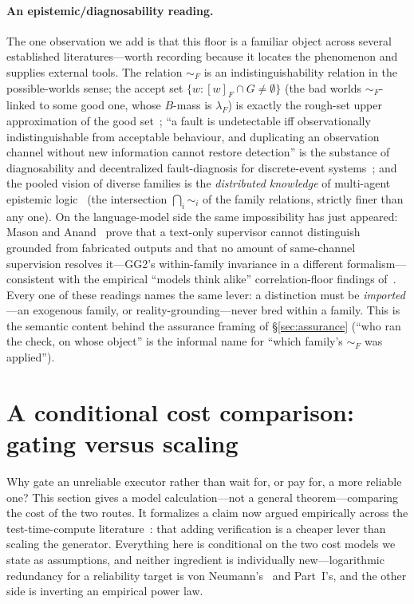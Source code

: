 \documentclass[11pt]{article}
\theoremstyle{definition}
\theoremstyle{remark}
\begin{document}
\paragraph{An epistemic/diagnosability reading.} The one observation we add is that this floor is a
familiar object across several established literatures---worth recording because it locates the
phenomenon and supplies external tools. The relation $\sim_F$ is an indistinguishability relation in the
possible-worlds sense; the accept set $\{w:[w]_F\cap G\neq\emptyset\}$ (the bad worlds $\sim_F$-linked to
some good one, whose $B$-mass is $\lambda_F$) is exactly the rough-set upper approximation of the good
set~\cite{pawlak1982}; ``a fault is undetectable iff observationally indistinguishable from acceptable
behaviour, and duplicating an observation channel without new information cannot restore detection'' is
the substance of diagnosability and decentralized fault-diagnosis for discrete-event
systems~\cite{sampath1995,debouk2000,descodiag2024}; and the pooled vision of diverse families is the
\emph{distributed knowledge} of multi-agent epistemic logic~\cite{fagin1995,halpernmoses1990} (the
intersection $\bigcap_i\sim_i$ of the family relations, strictly finer than any one). On the
language-model side the same impossibility has just appeared: Mason and Anand~\cite{masonanand2026} prove
that a text-only supervisor cannot distinguish grounded from fabricated outputs and that no amount of
same-channel supervision resolves it---GG2's within-family invariance in a different formalism---%
consistent with the empirical ``models think alike'' correlation-floor findings
of~\cite{goel2025,kim2025}. Every one of these readings names the same lever: a distinction must be
\emph{imported}---an exogenous family, or reality-grounding---never bred within a family. This is the
semantic content behind the assurance framing of \S\ref{sec:assurance} (``who ran the check, on whose
object'' is the informal name for ``which family's $\sim_F$ was applied'').

\section{A conditional cost comparison: gating versus scaling}\label{sec:cost}
Why gate an unreliable executor rather than wait for, or pay for, a more reliable one? This section
gives a model calculation---not a general theorem---comparing the cost of the two routes. It
formalizes a claim now argued empirically across the test-time-compute
literature~\cite{snell2024,lifshitz2025,scalingverif2026}: that adding verification is a cheaper lever
than scaling the generator. Everything here is conditional on the two cost models we state as
assumptions, and neither ingredient is individually new---logarithmic redundancy for a reliability
target is von Neumann's~\cite{vonneumann1956} and Part~I's, and the other side is inverting an
empirical power law.
\end{document}
